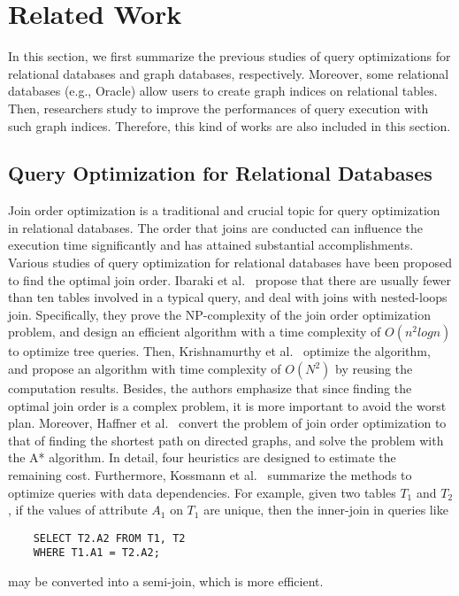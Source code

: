 \section{Related Work}
\label{sec:related-work}
 
In this section, we first summarize the previous studies of query optimizations for relational databases and graph databases, respectively.
Moreover, some relational databases (e.g., Oracle) allow users to create graph indices on relational tables.
Then, researchers study to improve the performances of query execution with such graph indices.
Therefore, this kind of works are also included in this section.

\subsection{Query Optimization for Relational Databases}
\label{sec:related-work:ropt}
Join order optimization is a traditional and crucial topic for query optimization in relational databases.
The order that joins are conducted can influence the execution time significantly and has attained substantial accomplishments.
Various studies of query optimization for relational databases have been proposed to find the optimal join order.
Ibaraki et al.~\cite{nested-tods-1984} propose that there are usually fewer than ten tables involved in a typical query, and deal with joins with nested-loops join.
Specifically, they prove the NP-complexity of the join order optimization problem, and design an efficient algorithm with a time complexity of $O(n^2logn)$ to optimize tree queries.
Then, Krishnamurthy et al.~\cite{optimize-nested-vldb-1986} optimize the algorithm, and propose an algorithm with time complexity of $O(N^2)$ by reusing the computation results.
Besides, the authors emphasize that since finding the optimal join order is a complex problem, it is more important to avoid the worst plan.
Moreover, Haffner et al.~\cite{astarjoin} convert the problem of join order optimization to that of finding the shortest path on directed graphs, and solve the problem with the A* algorithm.
In detail, four heuristics are designed to estimate the remaining cost.
Furthermore, Kossmann et al.~\cite{data-dependency-join} summarize the methods to optimize queries with data dependencies.
For example, given two tables $T_1$ and $T_2$, if the values of attribute $A_1$ on $T_1$ are unique, then the inner-join in queries like 
\begin{lstlisting}
    SELECT T2.A2 FROM T1, T2
    WHERE T1.A1 = T2.A2;
\end{lstlisting}
may be converted into a semi-join, which is more efficient.


